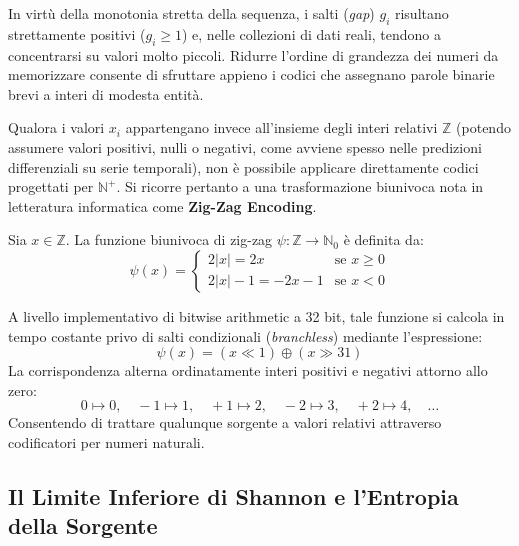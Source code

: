 In virt\`u della monotonia stretta della sequenza, i salti (\textit{gap}) $g_i$ risultano strettamente positivi ($g_i \ge 1$) e, nelle collezioni di dati reali, tendono a concentrarsi su valori molto piccoli. Ridurre l'ordine di grandezza dei numeri da memorizzare consente di sfruttare appieno i codici che assegnano parole binarie brevi a interi di modesta entit\`a.

Qualora i valori $x_i$ appartengano invece all'insieme degli interi relativi $\mathbb{Z}$ (potendo assumere valori positivi, nulli o negativi, come avviene spesso nelle predizioni differenziali su serie temporali), non \`e possibile applicare direttamente codici progettati per $\mathbb{N}^+$. Si ricorre pertanto a una trasformazione biunivoca nota in letteratura informatica come \textbf{Zig-Zag Encoding}.

\begin{definition}
Sia $x \in \mathbb{Z}$. La funzione biunivoca di zig-zag $\psi \colon \mathbb{Z} \to \mathbb{N}_0$ \`e definita da:
\begin{equation}
  \psi(x) = \begin{cases}
    2|x| = 2x & \text{se } x \ge 0 \\
    2|x| - 1 = -2x - 1 & \text{se } x < 0
  \end{cases}
\end{equation}
\end{definition}

A livello implementativo di bitwise arithmetic a 32 bit, tale funzione si calcola in tempo costante privo di salti condizionali (\textit{branchless}) mediante l'espressione:
\begin{equation}
  \psi(x) = (x \ll 1) \oplus (x \gg 31)
\end{equation}
La corrispondenza alterna ordinatamente interi positivi e negativi attorno allo zero:
\begin{equation*}
  0 \mapsto 0, \quad -1 \mapsto 1, \quad +1 \mapsto 2, \quad -2 \mapsto 3, \quad +2 \mapsto 4, \quad \dots
\end{equation*}
Consentendo di trattare qualunque sorgente a valori relativi attraverso codificatori per numeri naturali.

\FloatBarrier
\subsection{Il Limite Inferiore di Shannon e l'Entropia della Sorgente}
\label{subsec:limite-shannon-interi}

